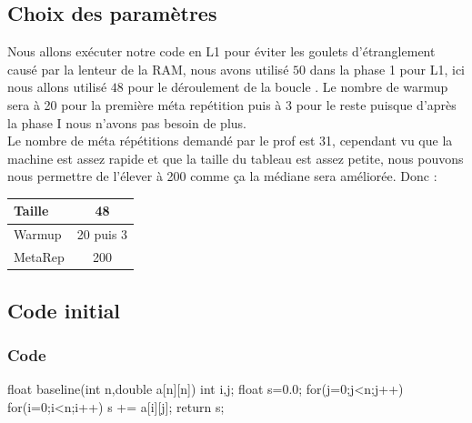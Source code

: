 \documentclass{report}
\begin{document}
  \subsection{Choix des paramètres}
    Nous allons exécuter notre code en L1 pour éviter les goulets d'étranglement causé par la lenteur
    de la RAM, nous avons utilisé $50$ dans la phase 1 pour L1, ici nous allons utilisé $48$ pour le déroulement de la boucle
    . Le nombre de warmup sera à 20 pour la première méta repétition puis à 3 pour le reste puisque
    d'après la phase I nous n'avons pas besoin de plus. \\
    Le nombre de méta répétitions demandé par le prof est 31, cependant vu que la machine est assez
    rapide et que la taille du tableau est assez petite, nous pouvons nous permettre de l'élever à 200
    comme ça la médiane sera améliorée.
    Donc :
    \begin{center}
      \begin{tabular}{ | l | c |  }
        \hline
        Taille & 48  \\ \hline
        Warmup & 20 puis 3  \\ \hline
        MetaRep & 200  \\ \hline
      \end{tabular}
    \end{center}
  \subsection{Code initial}
  \subsubsection{Code}
  \begin{cc}
    float baseline(int n,double a[n][n])
    {
        int i,j;
        float s=0.0;
        for(j=0;j<n;j++)
            for(i=0;i<n;i++)
                s += a[i][j];
        return s;
    }
  \end{cc}
\end{document}
